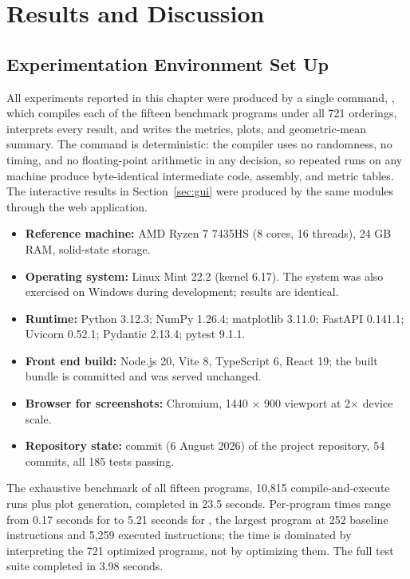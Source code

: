 \chapter{Results and Discussion}

\section{Experimentation Environment Set Up}

All experiments reported in this chapter were produced by a single command, , which compiles each of the fifteen benchmark programs under all 721 orderings, interprets every result, and writes the metrics, plots, and geometric-mean summary. The command is deterministic: the compiler uses no randomness, no timing, and no floating-point arithmetic in any decision, so repeated runs on any machine produce byte-identical intermediate code, assembly, and metric tables. The interactive results in Section~\ref{sec:gui} were produced by the same modules through the web application.

\begin{itemize}
  \item \textbf{Reference machine:} AMD Ryzen 7 7435HS (8 cores, 16 threads), 24 GB RAM, solid-state storage.
  \item \textbf{Operating system:} Linux Mint 22.2 (kernel 6.17). The system was also exercised on Windows during development; results are identical.
  \item \textbf{Runtime:} Python 3.12.3; NumPy 1.26.4; matplotlib 3.11.0; FastAPI 0.141.1; Uvicorn 0.52.1; Pydantic 2.13.4; pytest 9.1.1.
  \item \textbf{Front end build:} Node.js 20, Vite 8, TypeScript 6, React 19; the built bundle is committed and was served unchanged.
  \item \textbf{Browser for screenshots:} Chromium, 1440 $\times$ 900 viewport at 2$\times$ device scale.
  \item \textbf{Repository state:} commit  (6 August 2026) of the project repository, 54 commits, all 185 tests passing.
\end{itemize}

The exhaustive benchmark of all fifteen programs, 10{,}815 compile-and-execute runs plus plot generation, completed in 23.5 seconds. Per-program times range from 0.17 seconds for  to 5.21 seconds for \code{2mm}, the largest program at 252 baseline instructions and 5{,}259 executed instructions; the time is dominated by interpreting the 721 optimized programs, not by optimizing them. The full test suite completed in 3.98 seconds.

